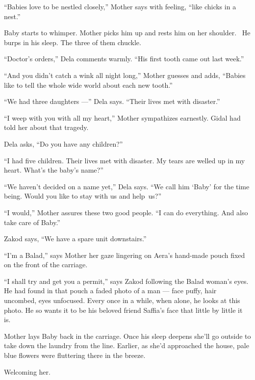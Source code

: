 \documentclass[twoside,11pt,openany]{book}
\begin{document}
``Babies love to be nestled closely,'' Mother says with feeling, ``like chicks in
a nest.''

Baby starts to whimper. Mother picks him up and rests him on her shoulder. ~He burps in his sleep. The three of them
chuckle.

``Doctor's orders,'' Dela comments warmly. ``His first tooth came out last
week.''

``And you didn't catch a wink all night long,'' Mother guesses and adds, ``Babies
like to tell the whole wide world about each new tooth.''

``We had three daughters ---'' Dela says. ``Their lives met with
disaster.''

``I weep with you with all my heart,'' Mother sympathizes earnestly. Gidal had told her about
that tragedy.

Dela asks, ``Do you have any children?''

``I had five children. Their lives met with disaster. My tears are welled up in my heart. What's the baby's
name?''

``We haven't decided on a name yet,'' Dela says. ``We call him `Baby' for the
time being. Would you like to stay with us and help~us?''

``I would,'' Mother assures these two good people. ``I can do everything. And
also take care of Baby.''

Zakod says, ``We have a spare unit downstairs.''

``I'm a Balad,'' says Mother her gaze lingering on Aera's hand-made pouch fixed on the front
of the carriage.

``I shall try and get you a permit,'' says Zakod following the Balad woman's eyes. He had
found in that pouch a faded photo of a man --- face puffy, hair uncombed, eyes unfocused. Every once in a while, when
alone, he looks at this photo. He so wants it to be his beloved friend Saffia's face that little by little it is.

Mother lays Baby back in the carriage. Once his sleep deepens she'll go outside to take down the laundry from the line.
Earlier, as she'd approached the house, pale blue flowers were fluttering there in the breeze.

Welcoming her.
\end{document}

